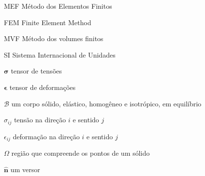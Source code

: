 
\listoffigures*
\cleardoublepage



\listoftables*
\cleardoublepage

\begin{siglas}
	\item[MEF] Método dos Elementos Finitos
	\item[FEM] Finite Element Method 
	\item[MVF] Método dos volumes finitos
	\item[SI]  Sistema Internacional de Unidades
\end{siglas}



\begin{simbolos}

  \item[$\bm{\sigma}$] tensor de tensões
  \item[$\bm{\epsilon}$] tensor de deformações
  \item[$\mathcal{B}$] um corpo sólido, elástico, homogêneo e isotrópico, em equilíbrio
  \item[$\sigma_{ij}$] tensão na direção $i$ e sentido $j$
  \item[$\epsilon_{ij}$] deformação na direção $i$ e sentido $j$
  \item[$\Omega$] região que compreende os pontos de um sólido 
  \item[$\bm{\hat{n}}$] um versor  
  
\end{simbolos}

